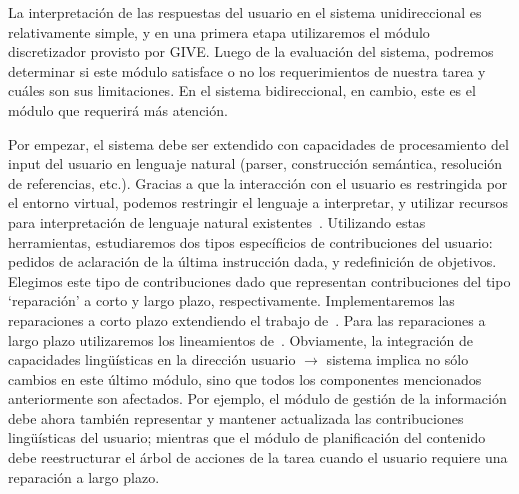 La interpretaci\'on de las respuestas del usuario en el sistema unidireccional
es relativamente simple, y en una primera etapa utilizaremos el m\'odulo
discretizador provisto por GIVE.  Luego de la evaluaci\'on del sistema,
podremos determinar si este m\'odulo satisface o no los requerimientos de 
nuestra tarea y cu\'ales son sus limitaciones.  En el sistema bidireccional,
en cambio, este es el m\'odulo que requerir\'a m\'as atenci\'on. 

Por empezar, el sistema debe ser extendido con capacidades de procesamiento 
del input del usuario en lenguaje natural (parser, construcci\'on sem\'antica, 
resoluci\'on de referencias, etc.).  Gracias a que la interacci\'on con el
usuario es restringida por el entorno virtual, podemos restringir el lenguaje 
a interpretar, y utilizar recursos para interpretaci\'on de lenguaje natural
existentes~\citep{kow06}.  Utilizando estas herramientas, estudiaremos dos 
tipos espec\'ificios de contribuciones del usuario: pedidos de aclaraci\'on 
de la \'ultima instrucci\'on dada, y redefinici\'on de objetivos.  Elegimos 
este tipo de contribuciones dado que representan contribuciones del tipo
`reparaci\'on' a corto y largo plazo, respectivamente. Implementaremos las
reparaciones a corto plazo extendiendo el trabajo de~\cite{purver06}.  Para 
las reparaciones a largo plazo utilizaremos los lineamientos
de~\cite{blaylock05a,blaylock05b}.  Obviamente, la integraci\'on de capacidades
ling\"u\'isticas en la direcci\'on usuario $\to$ sistema implica no s\'olo 
cambios en este \'ultimo m\'odulo, sino que todos los componentes mencionados 
anteriormente son afectados.  Por ejemplo, el m\'odulo de gesti\'on de la 
informaci\'on debe ahora tambi\'en representar y mantener actualizada las
contribuciones ling\"u\'isticas del usuario; mientras que el m\'odulo de
planificaci\'on del contenido debe reestructurar el \'arbol de acciones
de la tarea cuando el usuario requiere una reparaci\'on a largo plazo.  

